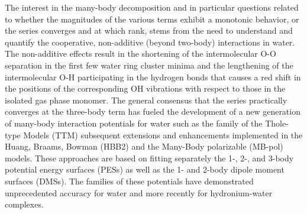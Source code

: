 \documentclass[11pt, proquest]{uwthesis}[2020/02/24]
\begin{document}
\par The interest in the many-body decomposition and in particular questions related to whether the magnitudes of the various terms exhibit a monotonic behavior, or the series converges and at which rank, stems from the need to understand and quantify the cooperative, non-additive (beyond two-body) interactions in water. The non-additive effects result in the shortening of the intermolecular O-O separation in the first few water ring cluster minima\autocite{xantheas_ab_1993, miliordos_optimal_2013} and the lengthening of the intermolecular O-H participating in the hydrogen bonds that causes a red shift in the positions of the corresponding OH vibrations with respect to those in the isolated gas phase monomer.\autocite{burnham_formation_2002} The general consensus that the series practically converges at the three-body term has fueled the development of a new generation of many-body interaction potentials for water such as the family of the Thole-type Models (TTM)\autocite{burnham_parametrization_1999, burnham_development_2002, burnham_development_2002-1, fanourgakis_flexible_2006, fanourgakis_development_2008} subsequent extensions and enhancements implemented in the Huang, Braams, Bowman (HBB2)\autocite{shank_accurate_2009, wang_towards_2010} and the Many-Body polarizable (MB-pol)\autocite{babin_toward_2012, babin_development_2013, babin_development_2013-1, babin_development_2014} models. These approaches are based on fitting separately the 1-, 2-, and 3-body potential energy surfaces (PESs) as well as the 1- and 2-body dipole moment surfaces (DMSs). The families of these potentials have demonstrated unprecedented accuracy for water\autocite{babin_development_2013, babin_development_2014, paesani_quantum_2007} and more recently for hydronium-water complexes\autocite{heindel_benchmark_2018}.
\end{document}
